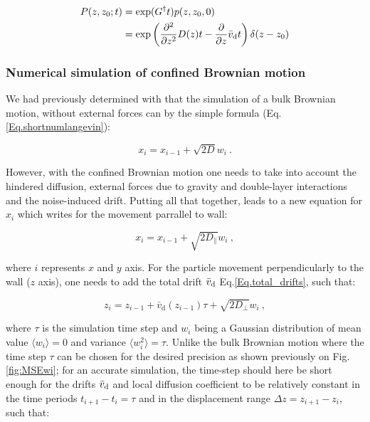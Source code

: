 \begin{equation}
	\begin{aligned}
	P(z, z_0; t) &= \exp (G^\dagger t) p(z, z_0, 0) \\
	& = \exp \left( \frac{\partial ^2}{\partial z ^2}  D(z)  t   -  \frac{\partial }{\partial z} \bar{v}_\textnormal{d} t\right) \delta (z - z_0)
	\end{aligned}
	\label{Eq.solfokker}
\end{equation} 

\subsubsection{Numerical simulation of confined Brownian motion}

We had previously determined with that the simulation of a bulk Brownian motion, without external forces can by the simple formula (Eq.\ref{Eq.shortnumlangevin}): 

\begin{equation}
	x_i = x_{i-1} + \sqrt{2D}w_i~.
\end{equation}

However, with the confined Brownian motion one needs to take into account the hindered diffusion, external forces due to gravity and double-layer interactions and the noise-induced drift. Putting all that together, leads to a new equation for $x_i$ which writes for the movement parrallel to wall:

\begin{equation}
	x_i = x_{i-1} +  \sqrt{2D_\parallel}w_i ~,
\end{equation}

where $i$ represents $x$ and $y$ axis. For the particle movement perpendicularly to the wall ($z$ axis), one needs to add the total drift $\bar{v}_\textnormal{d}$ Eq.\ref{Eq.total_drifts}, such that:

\begin{equation}
	z_i = z_{i-1} + \bar{v}_\mathrm{d}(z_{i-1}) \tau + \sqrt{2D_\bot}w_i ~,
\end{equation}

where $\tau$ is the simulation time step and $w_i$ being a Gaussian distribution of mean value $\langle w_i \rangle = 0$ and variance $\langle w_i ^2\rangle = \tau$. Unlike the bulk Brownian motion where the time step $\tau$ can be chosen for the desired precision as shown previously on Fig.\ref{fig:MSEwi}; for an accurate simulation, the time-step should here be short enough for the drifts $\bar{v}_\textnormal{d}$ and local diffusion coefficient to be relatively constant in the time periods $t_{i+1} - t_i = \tau$ and in the displacement range $\Delta z = z_{i+1} - z_i$, such that:

